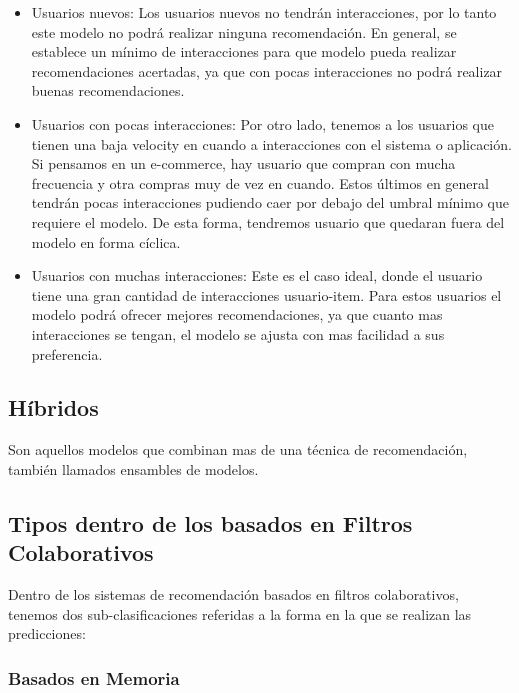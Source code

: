 \documentclass[11pt,a4paper,twoside]{thesis}
\begin{document}
\begin{itemize}
	\item Usuarios nuevos: Los usuarios nuevos no tendrán interacciones, por lo tanto este modelo no podrá realizar ninguna recomendación. En general, se establece un mínimo de interacciones para que modelo pueda realizar recomendaciones acertadas, ya que con pocas interacciones no podrá realizar buenas recomendaciones.
	\item Usuarios con pocas interacciones: Por otro lado, tenemos a los usuarios que tienen una baja velocity en cuando a interacciones con el sistema o aplicación. Si pensamos en un e-commerce, hay usuario que compran con mucha frecuencia y otra compras muy de vez en cuando. Estos últimos en general tendrán pocas interacciones pudiendo caer por debajo del umbral mínimo que requiere el modelo. De esta forma, tendremos usuario que quedaran fuera del modelo en forma cíclica.
	\item Usuarios con muchas interacciones: Este es el caso ideal, donde el usuario tiene una gran cantidad de interacciones usuario-item. Para estos usuarios el modelo podrá ofrecer mejores recomendaciones, ya que cuanto mas interacciones se tengan, el modelo se ajusta con mas facilidad a sus preferencia.

\end{itemize}

\clearpage
\subsection{Híbridos}

Son aquellos modelos que combinan mas de una técnica de recomendación, también llamados ensambles de modelos.

\subsection{Tipos dentro de los basados en Filtros Colaborativos} 

Dentro de los sistemas de recomendación basados en filtros colaborativos, tenemos dos sub-clasificaciones referidas a la forma en la que se realizan las predicciones:

 \subsubsection{Basados en Memoria} 
 
\end{document}
